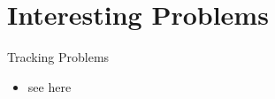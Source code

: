 \chapter*{Interesting Problems}
    Tracking Problems
    \begin{itemize}
        \item see here
    \end{itemize}